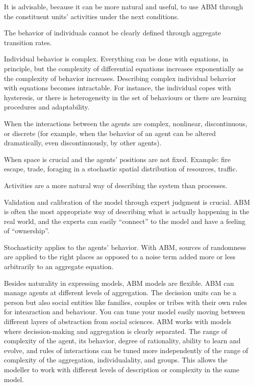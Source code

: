 \documentclass{report}
\begin{document}
It is advisable, because it can be more natural and useful, to use ABM through the constituent units' activities under the next conditions.
\begin{enumeration} 
\item The behavior of individuals cannot be clearly defined through aggregate transition rates.
\item Individual behavior is complex. Everything can be done with equations, in principle, but the complexity of differential equations increases exponentially as the complexity of behavior increases. Describing complex individual behavior with equations becomes intractable. For instance, the individual copes with hysteresis, or there is heterogeneity in the set of behaviours or there are learning procedures and adaptability.
\item When the interactions between the agents are complex, nonlinear, discontinuous, or discrete (for example, when the behavior of an agent can be altered dramatically, even discontinuously, by other agents).
\item When space is crucial and the agents' positions are not fixed. Example: fire escape, trade, foraging in a stochastic spatial distribution of resources, traffic.
\item Activities are a more natural way of describing the system than processes.
\item Validation and calibration of the model through expert judgment is crucial. ABM is often the most appropriate way of describing what is actually happening in the real world, and the experts can easily “connect” to the model and have a feeling of “ownership”. 
\item Stochasticity applies to the agents' behavior. With ABM, sources of randomness are applied to the right places as opposed to a noise term added more or less arbitrarily to an aggregate equation. 
\begin{end}

Besides naturality in expressing models, ABM models are flexible. ABM can manage agents at different levels of aggregation. The decission units can be a person but also social entities like families, couples or tribes with their own rules for intearaction and behaviour. You can tune your model easily moving between different layers of abstraction from social sciences. ABM works with models where decission-making and aggregation is clearly separated. The range of complexity of the agent,  its behavior, degree of rationality, ability to learn and evolve, and rules of interactions can be tuned more independently of the range of complexity of the aggregation, individualality, and groups. This allows the modeller to work with different levels of description or complexity in the same model. %


\end{end}
\end{enumeration}
\end{document}
